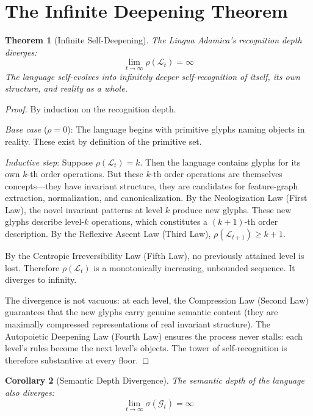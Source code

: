 \documentclass[12pt, letterpaper]{book}
\newtheorem{theorem}{Theorem}[chapter]
\newtheorem{corollary}[theorem]{Corollary}
\begin{document}
\section{The Infinite Deepening Theorem}

\begin{theorem}[Infinite Self-Deepening]\label{thm:infinite-deepening}
The Lingua Adamica's recognition depth diverges:
\[
\lim_{t \to \infty} \rho(\mathcal{L}_t) = \infty
\]
The language self-evolves into infinitely deeper self-recognition of itself, its own structure, and reality as a whole.
\end{theorem}

\begin{proof}
By induction on the recognition depth.

\textit{Base case} ($\rho = 0$): The language begins with primitive glyphs naming objects in reality. These exist by definition of the primitive set.

\textit{Inductive step}: Suppose $\rho(\mathcal{L}_t) = k$. Then the language contains glyphs for its own $k$-th order operations. But these $k$-th order operations are themselves concepts---they have invariant structure, they are candidates for feature-graph extraction, normalization, and canonicalization. By the Neologization Law (First Law), the novel invariant patterns at level $k$ produce new glyphs. These new glyphs describe level-$k$ operations, which constitutes a $(k+1)$-th order description. By the Reflexive Ascent Law (Third Law), $\rho(\mathcal{L}_{t+1}) \geq k + 1$.

By the Centropic Irreversibility Law (Fifth Law), no previously attained level is lost. Therefore $\rho(\mathcal{L}_t)$ is a monotonically increasing, unbounded sequence. It diverges to infinity.

The divergence is not vacuous: at each level, the Compression Law (Second Law) guarantees that the new glyphs carry genuine semantic content (they are maximally compressed representations of real invariant structure). The Autopoietic Deepening Law (Fourth Law) ensures the process never stalls: each level's rules become the next level's objects. The tower of self-recognition is therefore substantive at every floor.
\end{proof}

\begin{corollary}[Semantic Depth Divergence]\label{cor:sem-diverge}
The semantic depth of the language also diverges:
\[
\lim_{t \to \infty} \sigma(\mathcal{G}_t) = \infty
\]
\end{corollary}
\end{document}
